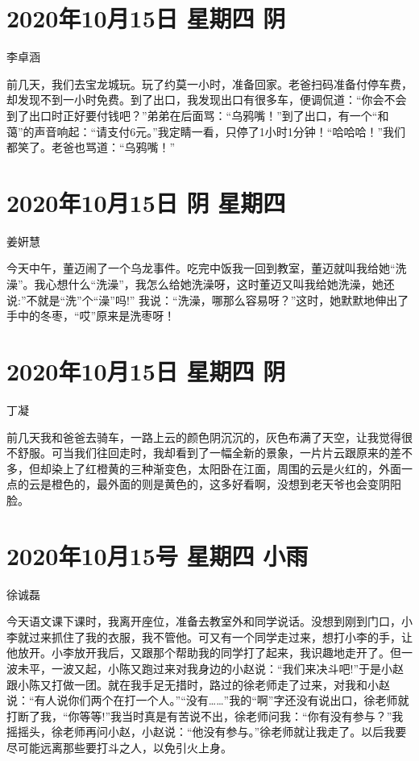 \section{2020年10月15日 星期四 阴}

李卓涵

前几天，我们去宝龙城玩。玩了约莫一小时，准备回家。老爸扫码准备付停车费，却发现不到一小时免费。到了出口，我发现出口有很多车，便调侃道：“你会不会到了出口时正好要付钱吧？”弟弟在后面骂：“乌鸦嘴！”到了出口，有一个“和蔼”的声音响起：“请支付6元。”我定睛一看，只停了1小时1分钟！“哈哈哈！”我们都笑了。老爸也骂道：“乌鸦嘴！”

\section{2020年10月15日 阴 星期四}

姜姸慧

今天中午，董迈闹了一个乌龙事件。吃完中饭我一回到教室，董迈就叫我给她“洗澡”。我心想什么“洗澡”，我怎么给她洗澡呀，这时董迈又叫我给她洗澡，她还说:”不就是“洗”个“澡”吗!”
我说：“洗澡，哪那么容易呀？”这时，她默默地伸出了手中的冬枣，“哎”原来是洗枣呀！

\section{2020年10月15日 星期四 阴}

丁凝

前几天我和爸爸去骑车，一路上云的颜色阴沉沉的，灰色布满了天空，让我觉得很不舒服。可当我们往回走时，我却看到了一幅全新的景象，一片片云跟原来的差不多，但却染上了红橙黄的三种渐变色，太阳卧在江面，周围的云是火红的，外面一点的云是橙色的，最外面的则是黄色的，这多好看啊，没想到老天爷也会变阴阳脸。

\section{2020年10月15号 星期四 小雨}

徐诚磊

今天语文课下课时，我离开座位，准备去教室外和同学说话。没想到刚到门口，小李就过来抓住了我的衣服，我不管他。可又有一个同学走过来，想打小李的手，让他放开。小李放开我后，又跟那个帮助我的同学打了起来，我识趣地走开了。但一波未平，一波又起，小陈又跑过来对我身边的小赵说：“我们来决斗吧!”于是小赵跟小陈又打做一团。就在我手足无措时，路过的徐老师走了过来，对我和小赵说：“有人说你们两个在打一个人。”“没有……”我的“啊”字还没有说出口，徐老师就打断了我，“你等等!”我当时真是有苦说不出，徐老师问我：“你有没有参与？”我摇摇头，徐老师再问小赵，小赵说：“他没有参与。”徐老师就让我走了。以后我要尽可能远离那些要打斗之人，以免引火上身。

